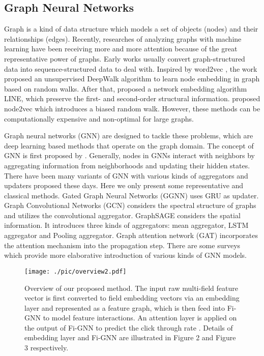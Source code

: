 \documentclass[sigconf]{acmart}
\begin{document}
\subsection{Graph Neural Networks}
Graph is a kind of data structure which models a set of objects (nodes) and their relationships (edges). 
Recently, researches of analyzing graphs with machine learning have been receiving more and more attention because of the great representative power of graphs.
Early works usually convert graph-structured data into sequence-structured data to deal with. 
Inspired by word2vec \cite{mikolov2013distributed},
the work \cite{perozzi2014deepwalk} proposed an unsupervised DeepWalk algorithm to learn node embedding in graph based on random walks. 
After that, \cite{tang2015line} proposed a network embedding algorithm LINE, which preserve the first- and second-order structural information.
\cite{Grover2016node2vec} proposed node2vec which introduces a biased random walk.
However, these methods can be computationally expensive and non-optimal for large graphs. 

Graph neural networks (GNN) are designed to tackle these problems, which are deep learning based methods that operate on the graph domain.
The concept of GNN is first proposed by \cite{scarselli2009graph}.
Generally, nodes in GNNs interact with neighbors by aggregating information from neighborhoods and updating their hidden states.
There have been many variants of GNN with various kinds of aggregators and updaters proposed these days.
Here we only present some representative and classical methods.
Gated Graph Neural Networks (GGNN) \cite{li2015gated} uses GRU \cite{cho2014learning} as updater.
Graph Convolutional Networks (GCN) \cite{kipf2016semi} considers the spectral structure of graphs and utilizes the convolutional aggregator.
GraphSAGE \cite{hamilton2017inductive} considers the spatial information. It introduces three kinds of aggregators:
mean aggregator, LSTM aggregator and Pooling aggregator.
Graph attention network (GAT) \cite{velivckovic2017graph} incorporates the attention mechanism into the propagation step.
There are some surveys \cite{wu2019comprehensive,zhou2018graph} which provide more elaborative introduction of various kinds of GNN models.

\begin{figure}[t]
\centering
\texttt{[image: ./pic/overview2.pdf]}
\caption{
Overview of our proposed method.
The input raw multi-field feature vector is first converted to field embedding vectors via an embedding layer and represented as a feature graph, which is then feed into Fi-GNN to model feature interactions.
An attention layer is applied on the output of Fi-GNN to predict the click through rate .
Details of embedding layer and Fi-GNN are illustrated in Figure 2 and Figure 3 respectively.}
\vspace{-4mm}
\label{fig:overview}
\end{figure}
\end{document}

